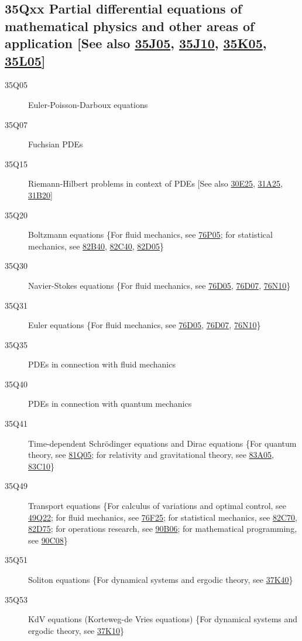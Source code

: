 \subsection*{35Qxx  Partial differential equations of mathematical physics and other areas of application [See also \hyperref[35J05]{35J05}, \hyperref[35J10]{35J10}, \hyperref[35K05]{35K05}, \hyperref[35L05]{35L05}] }\label{35Qxx}
\begin{description}  
\item [35Q05]\label{35Q05} Euler-Poisson-Darboux equations 
\item [35Q07]\label{35Q07} Fuchsian PDEs
\item [35Q15]\label{35Q15} Riemann-Hilbert problems in context of PDEs  [See also \hyperref[30E25]{30E25}, \hyperref[31A25]{31A25}, \hyperref[31B20]{31B20}]
\item [35Q20]\label{35Q20} Boltzmann equations \{For fluid mechanics, see \hyperref[76P05]{76P05}; for statistical mechanics, see \hyperref[82B40]{82B40}, \hyperref[82C40]{82C40}, \hyperref[82D05]{82D05}\}
\item [35Q30]\label{35Q30} Navier-Stokes equations \{For fluid mechanics, see \hyperref[76D05]{76D05}, \hyperref[76D07]{76D07}, \hyperref[76N10]{76N10}\}
\item [35Q31]\label{35Q31} Euler equations \{For fluid mechanics, see \hyperref[76D05]{76D05}, \hyperref[76D07]{76D07}, \hyperref[76N10]{76N10}\}
\item [35Q35]\label{35Q35} PDEs in connection with fluid mechanics
\item [35Q40]\label{35Q40} PDEs in connection with quantum mechanics
\item [35Q41]\label{35Q41} Time-dependent Schr\"{o}dinger equations and  Dirac equations \{For quantum theory, see \hyperref[81Q05]{81Q05}; for relativity and gravitational theory, see \hyperref[83A05]{83A05}, \hyperref[83C10]{83C10}\}
\item [35Q49]\label{35Q49} Transport equations \{For calculus of variations and optimal control, see \hyperref[49Q22]{49Q22}; for fluid mechanics, see \hyperref[76F25]{76F25}; for statistical mechanics, see \hyperref[82C70]{82C70}, \hyperref[82D75]{82D75}; for operations research, see \hyperref[90B06]{90B06}; for mathematical programming, see \hyperref[90C08]{90C08}\}
\item [35Q51]\label{35Q51} Soliton equations \{For dynamical systems and ergodic theory, see \hyperref[37K40]{37K40}\}
\item [35Q53]\label{35Q53} KdV equations (Korteweg-de Vries equations) \{For dynamical systems and ergodic theory, see \hyperref[37K10]{37K10}\}

\end{description}
